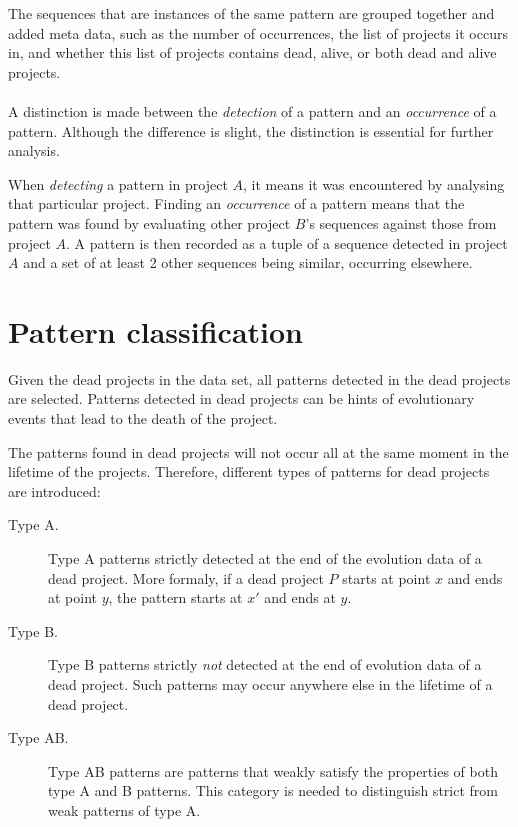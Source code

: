 The sequences that are instances of the same pattern are grouped together and
added meta data, such as the number of occurrences, the list of projects
it occurs in, and whether this list of projects contains dead, alive, or both
dead and alive projects.

\paragraph{}
A distinction is made between the \emph{detection }\rm of a pattern and an
\emph{occurrence }\rm of a pattern. Although the difference is slight, the
distinction is essential for further analysis.

When \emph{detecting }\rm a pattern in project $A$, it means it was
encountered by analysing that particular project. Finding an \emph{occurrence
}\rm of a pattern means that the pattern was found by evaluating other project
$B$'s sequences against those from project $A$. A pattern is then recorded as a
tuple of a sequence detected in project $A$ and a set of at least 2 other
sequences being similar, occurring elsewhere.

\section{Pattern classification}
\label{section:patterns_dead}
Given the dead projects in the data set, all patterns detected in the dead
projects are selected. Patterns detected in dead projects can be hints of
evolutionary events that lead to the death of the project.

The patterns found in dead projects will not occur all at the same moment in
the lifetime of the projects. Therefore, different types of patterns for dead
projects are introduced:

\begin{description}
	\item[Type A.] Type A patterns strictly detected at the end of the evolution
		data of a dead project. More formaly, if a dead project $P$ starts at point
		$x$ and ends at point $y$, the pattern starts at $x'$ and ends at $y$.
	
	\item[Type B.] Type B patterns strictly \emph{not }\rm detected at the end of
		evolution data of a dead project. Such patterns may occur anywhere else in
		the lifetime of a dead project.
	
	\item[Type AB.] Type AB patterns are patterns that weakly satisfy the
		properties of both type A and B patterns. This category is needed to
		distinguish strict from weak patterns of type A.
\end{description}

